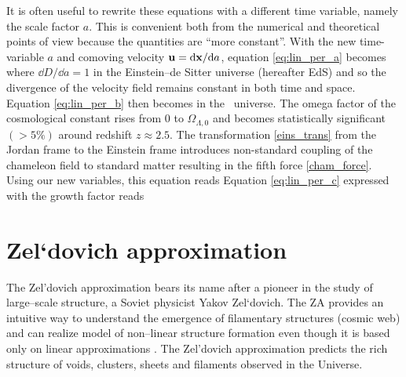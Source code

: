 It is often useful to rewrite these equations with a different time variable, namely the scale factor $a$. This is convenient both from the numerical and theoretical points of view because the quantities are ``more constant''. With the new time-variable $a$ and comoving velocity $\mathbf u = \mbox{d} \mathbf x/\mbox{d} a$, equation \eqref{eq:lin_per_a} becomes
where $\dd D/\dd a = 1$ in the Einstein--de Sitter universe (hereafter EdS) and so the divergence of the velocity field remains constant in both time and space. Equation \eqref{eq:lin_per_b} then becomes
in the \LCDM\ universe. The omega factor of the cosmological constant
rises from $0$ to $\Omega_{\Lambda,0}$ and becomes statistically significant $(>5\%)$ around redshift $z\approx2.5$. The transformation \eqref{eins_trans} from the Jordan frame to the Einstein frame introduces non-standard coupling of the chameleon field to standard matter resulting in the fifth force \eqref{cham_force}. Using our new variables, this equation reads
Equation \eqref{eq:lin_per_c} expressed with the growth factor reads
\section{Zel`dovich approximation}
The Zel'dovich approximation \parencite[hereafter ZA;][]{1970A&A.....5...84Z} bears its name after a pioneer in the study of large--scale structure, a Soviet physicist Yakov Zel`dovich. The ZA provides an intuitive way to understand the emergence of filamentary structures (cosmic web) and can realize model of non--linear structure formation even though it is based only on linear approximations \parencite{2014MNRAS.439.3630W}. The Zel’dovich approximation predicts the rich structure of voids, clusters, sheets and filaments observed in the Universe.

